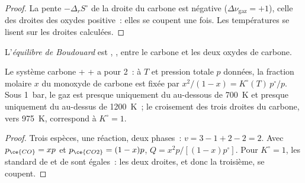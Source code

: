 \begin{proof}
La pente $-\Delta_r S^\circ$ de la droite du carbone est négative ($\Delta\nu_{\text{gaz}}
= +1$), celle des droites des oxydes positive~: elles se coupent une fois. Les températures
se lisent sur les droites calculées.
\end{proof}

\begin{definition}\label{def:b2:ellingham:boudouard}
L'\emph{équilibre de Boudouard} est ,
, entre le carbone et les deux oxydes de carbone.
\end{definition}

\begin{proposition}\label{prop:b2:ellingham:boudouard}
Le système carbone +  +  a pour  2~: à $T$ et pression totale
$p$ données, la fraction molaire $x$ du monoxyde de carbone est fixée par $x^2/(1 - x)
= K^\circ(T)\,p^\circ/p$. Sous \qty{1}{bar}, le gaz est presque uniquement du 
au-dessous de \qty{700}{K} et presque uniquement du  au-dessus de \qty{1200}{K}~; le croisement des
trois droites du carbone, vers \qty{975}{K}, correspond à $K^\circ = 1$.
\end{proposition}

\begin{proof}
Trois espèces, une réaction, deux phases~: $v = 3 - 1 + 2 - 2 = 2$. Avec $p_{\ce{CO}}
= xp$ et $p_{\ce{CO2}} = (1 - x)p$, $Q = x^2p/[(1 - x)p^\circ]$. Pour $K^\circ = 1$,
les  standard de  et de  sont
égales~: les deux droites, et donc la troisième, se coupent.
\end{proof}

